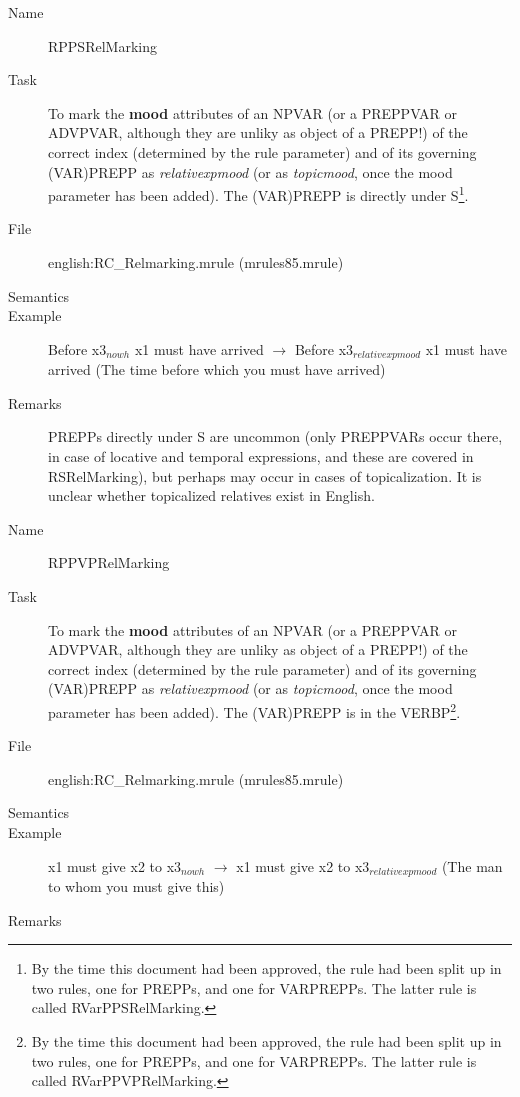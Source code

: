 \begin{description}
\vspace{1 cm}
\begin{description}
\item[Name] RPPSRelMarking
\item[Task] To mark the {\bf mood} attributes of an NPVAR (or a PREPPVAR or 
ADVPVAR, although they are unliky as object of a PREPP!) of the correct 
index (determined by the rule parameter) and of its governing (VAR)PREPP as 
{\em relativexpmood\/} (or as {\em 
topicmood\/}, once the mood parameter has been added).
 The (VAR)PREPP is directly under S\footnote{By the  
time this document had been approved, the rule had been split up in two rules, 
one for PREPPs, and one for VARPREPPs. The latter rule is called 
RVarPPSRelMarking.}.
\item[File] english:RC\_Relmarking.mrule (mrules85.mrule)
\item[Semantics]
\item[Example] Before x3$_{nowh}$ x1 must have arrived $\rightarrow$ Before 
x3$_{relativexpmood}$ x1 must have arrived (The time before which you must 
have arrived)
\item[Remarks] PREPPs directly under S are uncommon (only PREPPVARs occur 
there, in case of locative and temporal expressions, and these are covered in 
RSRelMarking), but perhaps may occur in 
cases of topicalization. It is unclear whether topicalized relatives exist in 
English.
\end{description}

\vspace{1 cm}
\begin{description}
\item[Name] RPPVPRelMarking
\item[Task] To mark the {\bf mood} attributes of an NPVAR (or a PREPPVAR or 
ADVPVAR, although they are unliky as object of a PREPP!) of the correct 
index (determined by the rule parameter) and of its governing (VAR)PREPP as 
{\em relativexpmood\/} (or as {\em 
topicmood\/}, once the mood parameter has been added).
 The (VAR)PREPP is in the VERBP\footnote{By the  
time this document had been approved, the rule had been split up in two rules, 
one for PREPPs, and one for VARPREPPs. The latter rule is called 
RVarPPVPRelMarking.}.
\item[File] english:RC\_Relmarking.mrule (mrules85.mrule)
\item[Semantics]
\item[Example] x1 must give x2 to x3$_{nowh}$ $\rightarrow$ x1 must give x2 to 
x3$_{relativexpmood}$ (The man to whom you must give this)
\item[Remarks] 
\end{description}

\end{description}

